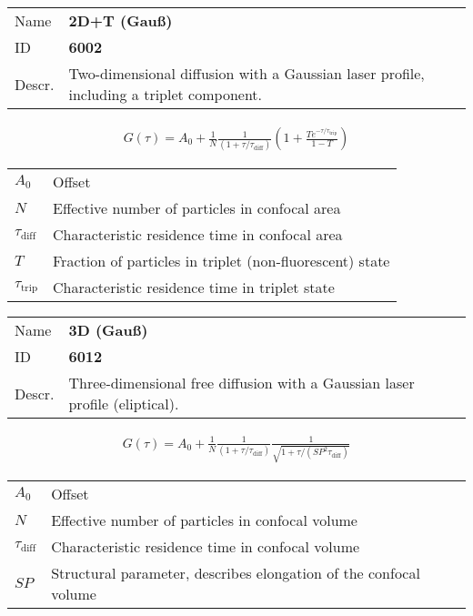 \noindent \begin{tabular}{lp{}}
Name & \textbf{2D+T (Gauß)} \\ 
ID & \textbf{6002} \\ 
Descr. &  Two-dimensional diffusion with a Gaussian laser profile, including a triplet component. \\ 
\end{tabular}
\begin{align}
G(\tau) = A_0 + \frac{1}{N} \frac{1}{(1+\tau/\tau_\mathrm{diff})}  \left(1 + \frac{T e^{-\tau/\tau_\mathrm{trip}}}{1-T}  \right)
\end{align} 
\begin{center}
\begin{tabular}{ll}
$A_0$ & Offset \\ 
$N$ & Effective number of particles in confocal area \\ 
$\tau_\mathrm{diff}$ &  Characteristic residence time in confocal area \\ 
$T$ &  Fraction of particles in triplet (non-fluorescent) state\\ 
$\tau_\mathrm{trip}$ &  Characteristic residence time in triplet state \\ 
\end{tabular}
\end{center}
\vspace{2em}


\noindent \begin{tabular}{lp{}}
Name & \textbf{3D (Gauß)} \\ 
ID & \textbf{6012} \\ 
Descr. &  Three-dimensional free diffusion with a Gaussian laser profile (eliptical). \\ 
\end{tabular}
\begin{align}
G(\tau) = A_0 + \frac{1}{N} \frac{1}{(1+\tau/\tau_\mathrm{diff})} \frac{1}{\sqrt{1+\tau/(\mathit{SP}^2 \tau_\mathrm{diff})}}
\end{align} 
\begin{center}
\begin{tabular}{ll}
$A_0$ & Offset \\ 
$N$ & Effective number of particles in confocal volume \\ 
$\tau_\mathrm{diff}$ &  Characteristic residence time in confocal volume \\ 
$\mathit{SP}$ & Structural parameter, describes elongation of the confocal volume \\
\end{tabular}
\end{center}
\vspace{2em}


